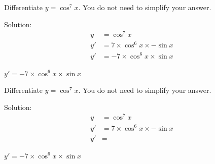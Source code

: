 \begin{mtask}
  \task \begin{exercise} Differentiate $y=\cos^7x$. You do not need to simplify your answer.\\
             \begin{envSolution}
			      Solution:
			      \begin{align*}
			           y & =\cos^7x                             \\[20pt]
                       y' & =7 \times \cos^6 x \times -\sin x   \\[10pt]
					   y' & =-7 \times \cos^6 x \times \sin x
				 \end{align*}
                 \begin{shortsolution}  
				       $y'  =-7 \times \cos^6 x \times \sin x$
			     \end{shortsolution}				 
               \end{envSolution}
         \end{exercise}
  \task \begin{exercise} Differentiate $y=\cos^7x$. You do not need to simplify your answer.\\
             \begin{envSolution}
			      Solution:
			      \begin{align*}
			           y & =\cos^7x                             \\[20pt]
                       y' & =7 \times \cos^6 x \times -\sin x   \\[10pt]
					   y' & =
				 \end{align*}
                 \begin{shortsolution}  
				       $y'  =-7 \times \cos^6 x \times \sin x$
			     \end{shortsolution}				 
               \end{envSolution}
         \end{exercise}
\end{mtask}
\clearpage
